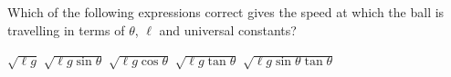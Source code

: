\documentclass{../../oss-apphys-exam}
\begin{document}
\begin{multicols*}{2}
\begin{questions}
{{    \question Which of the following expressions correct gives the speed at
    which the ball is travelling in terms of $\theta$, $\ell$ and universal
    constants?
    \label{conical2}
    \begin{choices}
      \choice $\sqrt{\ell g}$
      \choice $\sqrt{\ell g\sin\theta}$
      \choice $\sqrt{\ell g\cos\theta}$
      \choice $\sqrt{\ell g\tan\theta}$
      \choice $\sqrt{\ell g\sin\theta\tan\theta}$
    \end{choices}

%
}}
\end{questions}
\end{multicols*}
\end{document}
